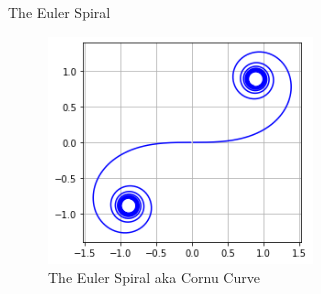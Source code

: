 \documentclass{beamer}
\begin{document}
\begin{frame}{The Euler Spiral}
	\begin{figure}
		\caption{The Euler Spiral aka Cornu Curve}
		\centering
		\includegraphics[width=70mm, scale=0.5]{euler_spiral.png}
	\end{figure}
	
\end{frame}
\end{document}
